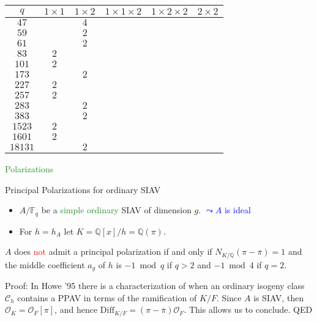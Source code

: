 \documentclass[usenames,dvipsnames,handout]{beamer}
\def\Q{\mathbb{Q}}
\def\F{\mathbb{F}}
\newcommand{\cC}{{\mathcal C}}
\newcommand{\cO}{{\mathcal O}}
\newcommand{\red}[1]{\textcolor{red}{#1}}
\newcommand{\blue}[1]{\textcolor{blue}{#1}}
\newcommand{\green}[1]{\textcolor{ForestGreen}{#1}}
\begin{document}
\begin{frame}{ }
    \begin{table}[!ht]
  \begin{center}
  \begin{tabular}{|c||c|c|c|c|c|}\hline
  $q$ & $1 \times 1$ & $1 \times 2$ & $1 \times 1 \times 2$ & $1 \times 2 \times 2$ & $2 \times 2$ \\\hline\hline
  $47$ & $ $ & $4$ & $ $ & $ $ & $ $ \\\hline
  $59$ & $ $ & $2$ & $ $ & $ $ & $ $ \\\hline
  $61$ & $ $ & $2$ & $ $ & $ $ & $ $ \\\hline
  $83$ & $2$ & $ $ & $ $ & $ $ & $ $ \\\hline
  $101$ & $2$ & $ $ & $ $ & $ $ & $ $ \\\hline
  $173$ & $ $ & $2$ & $ $ & $ $ & $ $ \\\hline
  $227$ & $2$ & $ $ & $ $ & $ $ & $ $ \\\hline
  $257$ & $2$ & $ $ & $ $ & $ $ & $ $ \\\hline
  $283$ & $ $ & $2$ & $ $ & $ $ & $ $ \\\hline
  $383$ & $ $ & $2$ & $ $ & $ $ & $ $ \\\hline
  $1523$ & $2$ & $ $ & $ $ & $ $ & $ $ \\\hline
  $1601$ & $2$ & $ $ & $ $ & $ $ & $ $ \\\hline
  $18131$ & $ $ & $2$ & $ $ & $ $ & $ $ \\\hline
  \end{tabular}
  \end{center}
\end{table}
\end{frame}

\begin{frame}{ }
    \begin{center}
    \green{\huge Polarizations}
    \end{center}
\end{frame}

\begin{frame}{ Principal Polarizations for ordinary SIAV }
    \begin{itemize}
        \item 	$A/\F_q$ be a \green{simple ordinary} SIAV of dimension $g$. \blue{$\leadsto A$ is ideal}
    	 \item For $h=h_A$ let $K=\Q[x]/h=\Q(\pi)$.
    \end{itemize}
    \pause
	\begin{theorem}
	  $A$ does \red{not} admit a principal polarization if and only if $N_{K/\Q}(\pi - \overline{\pi}) = 1$ and the middle coefficient $a_g$ of $h$ is $-1 \bmod{q}$ if $q > 2$ and $-1 \bmod{4}$ if $q = 2$.
	\end{theorem}
	\pause Proof: In Howe '95 there is a characterization of when an ordinary isogeny class $\cC_h$ contains a PPAV in terms of the ramification of $K/F$.	
	\pause Since $A$ is SIAV, then $\cO_K=\cO_F[\pi]$, and hence $\mathrm{Diff}_{K/F}=(\pi-\overline{\pi})\cO_F$. This allows us to conclude. \qquad QED
\end{frame}
\end{document}
